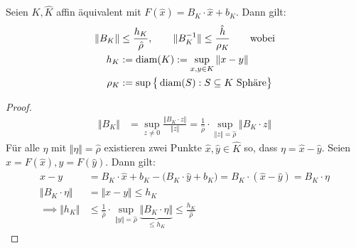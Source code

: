 \begin{lemma}\label{lemma4.10}
Seien $K,\hat{K}$ affin äquivalent mit $F(\hat{x})=B_K\cdot\hat{x}+b_K$. Dann gilt:
\begin{align*}
\Vert B_K\Vert&\leq\frac{h_K}{\hat{\rho}},\qquad\Vert B_K^{-1}\Vert\leq\frac{\hat{h}}{\rho_K}\qquad\text{wobei}\\
h_K&:=\operatorname{diam}(K):=\sup\limits_{x,y\in K}\Vert x-y\Vert\\
\rho_K&:=\sup\big\lbrace\operatorname{diam}(S):S\subseteq K\text{ Sphäre}\big\rbrace
\end{align*}
\end{lemma}
\begin{proof}
\begin{align*}
\Vert B_K\Vert&=\sup\limits_{z\neq0}\frac{\Vert B_K \cdot z\Vert}{\Vert z\Vert}=\frac{1}{\hat{\rho}}\cdot\sup\limits_{\Vert z\Vert=\hat{\rho}}\Vert B_K \cdot z\Vert
\end{align*}
Für alle $\eta$ mit $\Vert \eta\Vert=\hat{\rho}$ existieren zwei Punkte $\hat{x},\hat{y}\in\hat{K}$ so, dass $\eta=\hat{x}-\hat{y}$. Seien $x=F(\hat{x}),y=F(\hat{y})$. Dann gilt:
\begin{align*}
x-y&=B_K\cdot\hat{x}+b_K-\big(B_K\cdot\hat{y}+b_K\big)=B_K\cdot(\hat{x}-\hat{y})=B_K \cdot \eta\\
\Vert B_K\cdot \eta\Vert&=\Vert x-y\Vert\leq h_K\\
\implies \Vert h_K\Vert&\leq\frac{1}{\hat{\rho}}\cdot\sup\limits_{\Vert y\Vert=\hat{\rho}}\underbrace{\Vert B_K\cdot \eta\Vert}_{\leq h_K}\leq\frac{h_K}{\hat{\rho}}
\end{align*}
\end{proof}


